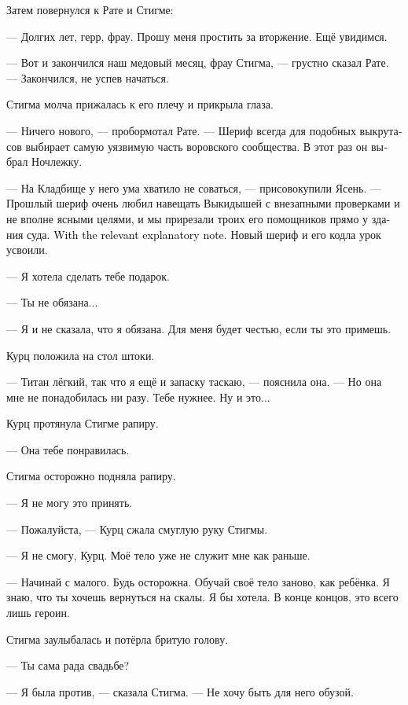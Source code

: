 \documentclass[a4paper,12pt,fleqn]{book}\usepackage{cooltooltips}\usepackage{polyglossia}\setdefaultlanguage[babelshorthands=true]{russian}\setotherlanguage{english}\defaultfontfeatures{Ligatures=TeX,Mapping=tex-text} \usepackage{xcolor}\definecolor{lightgray}{HTML}{bbbbbb}\color{lightgray}\newcommand{\ml}[3]{\textenglish{\textcolor{black}{#3}}}
\newcommand{\asterism}{\vspace{1em}{\centering\Large\bfseries$\ast~\ast~\ast$\par}\vspace{1em}}
\begin{document}
Затем повернулся к Рате и Стигме:

--- Долгих лет, герр, фрау.
Прошу меня простить за вторжение.
Ещё увидимся.

--- Вот и закончился наш медовый месяц, фрау Стигма, --- грустно сказал Рате.
--- Закончился, не успев начаться.

Стигма молча прижалась к его плечу и прикрыла глаза.

\asterism

--- Ничего нового, --- пробормотал Рате.
--- Шериф всегда для подобных выкрутасов выбирает самую уязвимую часть воровского сообщества.
В этот раз он выбрал Ночлежку.

--- На Кладбище у него ума хватило не соваться, --- присовокупили Ясень.
--- Прошлый шериф очень любил навещать Выкидышей с внезапными проверками и не вполне ясными целями, и мы прирезали троих его помощников прямо у здания суда.
\ml{$0$}
{С соответствующей пояснительной запиской.}
{With the relevant explanatory note.}
Новый шериф и его кодла урок усвоили.

\asterism

--- Я хотела сделать тебе подарок.

--- Ты не обязана...

--- Я и не сказала, что я обязана.
Для меня будет честью, если ты это примешь.

Курц положила на стол штоки.

--- Титан лёгкий, так что я ещё и запаску таскаю, --- пояснила она.
--- Но она мне не понадобилась ни разу.
Тебе нужнее.
Ну и это...

Курц протянула Стигме рапиру.

--- Она тебе понравилась.

Стигма осторожно подняла рапиру.

--- Я не могу это принять.

--- Пожалуйста, --- Курц сжала смуглую руку Стигмы.

--- Я не смогу, Курц.
Моё тело уже не служит мне как раньше.

--- Начинай с малого.
Будь осторожна.
Обучай своё тело заново, как ребёнка.
Я знаю, что ты хочешь вернуться на скалы.
Я бы хотела.
В конце концов, это всего лишь героин.

Стигма заулыбалась и потёрла бритую голову.

--- Ты сама рада свадьбе?

--- Я была против, --- сказала Стигма.
--- Не хочу быть для него обузой.
\end{document}
